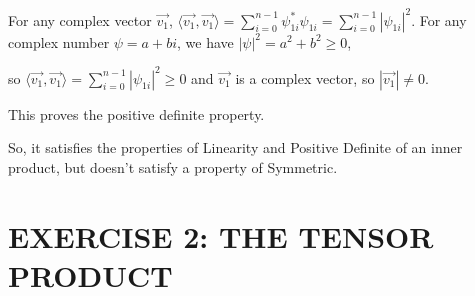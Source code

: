 \documentclass{article}
\begin{document}
\begin{enumerate}
          For any complex vector $\vec{v_1}$, $\langle \vec{v_1},\vec{v_1}\rangle=\sum_{i=0}^{n-1}\psi_{1i}^*\psi_{1i}=\sum_{i=0}^{n-1}|\psi_{1i}|^2$.
          For any complex number $\psi=a+bi$, we have $|\psi|^2=a^2+b^2\geq0$,

          so $\langle \vec{v_1},\vec{v_1}\rangle=\sum_{i=0}^{n-1}|\psi_{1i}|^2\geq0$ and $\vec{v_1}$ is a complex vector, so $|\vec{v_1}|\neq0$.

          This proves the positive definite property.

          So, it satisfies the properties of Linearity and Positive Definite of an inner product, but doesn't satisfy a property of Symmetric.
\end{enumerate}
\section*{EXERCISE 2: THE TENSOR PRODUCT}
\end{document}
